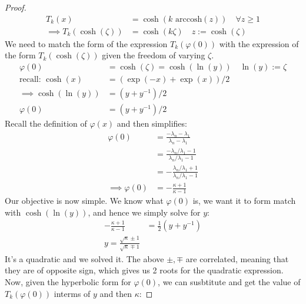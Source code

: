\documentclass[]{article}
\theoremstyle{definition}
\begin{document}
\begin{proof}
                \begin{align}
                    T_k(x) &= \cosh(k\text{ arccosh}(z)) \quad \forall z \ge 1
                    \\
                    \implies
                    T_k(\cosh(\zeta)) &= \cosh(k\zeta) \quad z := \cosh(\zeta)
                \end{align}
                We need to match the form of the expression $T_k(\varphi(0))$ with the expression of the form $T_k(\cosh(\zeta))$ given the freedom of varying $\zeta$. 
                \begin{align}
                    \varphi(0) &= \cosh(\zeta) = \cosh(\ln(y)) \quad \ln(y) := \zeta
                    \\
                    \text{recall: } \cosh(x) &= (\exp(-x) + \exp(x))/2
                    \\
                    \implies 
                    \cosh(\ln(y)) &= (y + y^{-1})/2
                    \\
                    \varphi(0) &= (y + y^{-1})/2
                \end{align}
                Recall the definition of $\varphi(x)$ and then simplifies: 
                $$
                \begin{aligned}
                    \varphi(0) &= \frac{-\lambda_n - \lambda_1}{\lambda_n - \lambda_1}
                    \\
                    &= \frac{-\lambda_n/\lambda_1 - 1}{\lambda_n/\lambda_1 - 1}
                    \\ 
                    &= - 
                    \frac{\lambda_n/\lambda_1 + 1}{\lambda_n/\lambda_1 - 1} 
                    \\
                    \implies \varphi(0) &=
                    -\frac{\kappa + 1}{\kappa - 1}
                \end{aligned}
                $$
                Our objective is now simple. We know what $\varphi(0)$ is, we want it to form match with $\cosh(\ln(y))$, and hence we simply solve for $y$: 
                \begin{align}
                    -\frac{\kappa + 1}{\kappa - 1} &= 
                    \frac{1}{2}(y + y^{-1})
                    \\
                    y = \frac{\sqrt{\kappa}\pm 1}{\sqrt{\kappa}\mp 1}
                \end{align}
                It's a quadratic and we solved it. The above $\pm, \mp$ are correlated, meaning that they are of opposite sign, which gives us 2 roots for the quadratic expression. Now, given the hyperbolic form for $\varphi(0)$, we can susbtitute and get the value of $T_k(\varphi(0))$ interms of $y$ and then $\kappa$: 

\end{proof}
\end{document}
